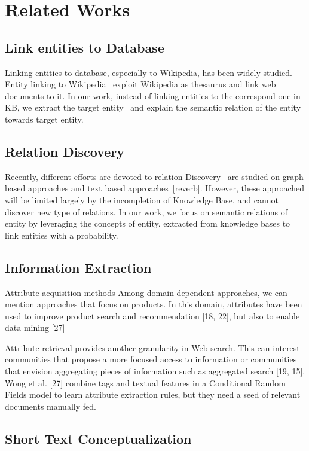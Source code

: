 \section{Related Works}




\subsection{Link entities to Database}

Linking entities to database, especially to Wikipedia, has been widely studied. Entity linking to Wikipedia~\cite{milne2008learning,mihalcea2007wikify,han2011collective} exploit Wikipedia as thesaurus and link web documents to it.
In our work, instead of linking entities to the correspond one in KB, we extract the target entity~\cite{dalvi2011automatic} and explain the semantic relation of the entity towards target entity.


\subsection{Relation Discovery}

Recently, different efforts are devoted to relation Discovery~\cite{fang2011rex,shahaf2010connecting,luo2007answering} are studied on graph based approaches and text based approaches~\cite{hasegawa2004discovering}[reverb].
However, these approached will be limited largely by the incompletion of Knowledge Base, and cannot discover new type of relations.
In our work, we focus on semantic relations of entity by leveraging the concepts of entity. extracted from knowledge bases to link entities with a probability.


\subsection{Information Extraction}

Attribute acquisition methods
Among domain-dependent approaches, we can mention approaches that focus on products. In this domain, attributes have been used to improve product search and recommendation [18, 22], but also to enable data mining [27]

Attribute retrieval provides another granularity in Web
search. This can interest communities that propose a more
focused access to information or communities that envision
aggregating pieces of information such as aggregated search
[19, 15].
Wong et al. [27]
combine tags and textual features in a Conditional Random
Fields model to learn attribute extraction rules, but they
need a seed of relevant documents manually fed.

\subsection{Short Text Conceptualization}
